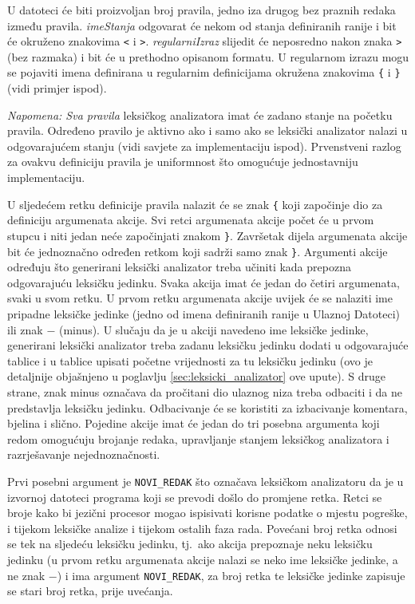 \documentclass[times, 12pt, utf8]{book}
\begin{document}
U datoteci će biti proizvoljan broj pravila, jedno iza drugog bez praznih redaka između pravila.
\emph{imeStanja} odgovarat će nekom od stanja definiranih ranije i bit će okruženo znakovima \verb|<| i \verb|>|.
\emph{regularniIzraz} slijedit će neposredno nakon znaka \verb|>| (bez razmaka) i bit će u prethodno opisanom formatu.
U regularnom izrazu mogu se pojaviti imena definirana u regularnim definicijama okružena znakovima \verb|{| i \verb|}| (vidi primjer ispod).

\emph{Napomena: Sva pravila} leksičkog analizatora imat će zadano stanje na početku pravila.
Određeno pravilo je aktivno ako i samo ako se leksički analizator nalazi u odgovarajućem stanju (vidi savjete za implementaciju ispod).
Prvenstveni razlog za ovakvu definiciju pravila je uniformnost što omogućuje jednostavniju implementaciju.

U sljedećem retku definicije pravila nalazit će se znak \verb|{| koji započinje dio za definiciju argumenata akcije.
Svi retci argumenata akcije počet će u prvom stupcu i niti jedan neće započinjati znakom \verb|}|.
Završetak dijela argumenata akcije bit će jednoznačno određen retkom koji sadrži samo znak \verb|}|.
Argumenti akcije određuju što generirani leksički analizator treba učiniti kada prepozna odgovarajuću leksičku jedinku.
Svaka akcija imat će jedan do četiri argumenata, svaki u svom retku.
U prvom retku argumenata akcije uvijek će se nalaziti ime pripadne leksičke jedinke (jedno od imena definiranih ranije u Ulaznoj Datoteci) ili znak \(-\) (minus).
U slučaju da je u akciji navedeno ime leksičke jedinke, generirani leksički analizator treba zadanu leksičku jedinku dodati u odgovarajuće tablice i u tablice upisati početne vrijednosti za tu leksičku jedinku (ovo je detaljnije objašnjeno u poglavlju \ref{sec:leksicki_analizator} ove upute).
S druge strane, znak minus označava da pročitani dio ulaznog niza treba odbaciti i da ne predstavlja leksičku jedinku.
Odbacivanje će se koristiti za izbacivanje komentara, bjelina i slično.
Pojedine akcije imat će jedan do tri posebna argumenta koji redom omogućuju brojanje redaka, upravljanje stanjem leksičkog analizatora i razrješavanje nejednoznačnosti.

Prvi posebni argument je \verb|NOVI_REDAK| što označava leksičkom analizatoru da je u izvornoj datoteci programa koji se prevodi došlo do promjene retka.
Retci se broje kako bi jezični procesor mogao ispisivati korisne podatke o mjestu pogreške, i tijekom leksičke analize i tijekom ostalih faza rada.
Povećani broj retka odnosi se tek na sljedeću leksičku jedinku, tj.~ako akcija prepoznaje neku leksičku jedinku (u prvom retku argumenata akcije nalazi se neko ime leksičke jedinke, a ne znak \(-\)) i ima argument \verb|NOVI_REDAK|, za broj retka te leksičke jedinke zapisuje se stari broj retka, prije uvećanja.
\end{document}
